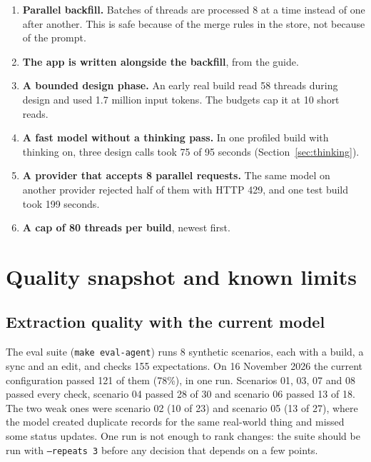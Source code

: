 \documentclass[10pt,a4paper]{article}
\newcommand{\code}[1]{\texttt{\small #1}}
\begin{document}
\begin{enumerate}
\item \textbf{Parallel backfill.} Batches of threads are processed 8 at a time instead of one after another. This is safe because of the merge rules in the store, not because of the prompt.
\item \textbf{The app is written alongside the backfill}, from the guide.
\item \textbf{A bounded design phase.} An early real build read 58 threads during design and used 1.7 million input tokens. The budgets cap it at 10 short reads.
\item \textbf{A fast model without a thinking pass.} In one profiled build with thinking on, three design calls took 75 of 95 seconds (Section~\ref{sec:thinking}).
\item \textbf{A provider that accepts 8 parallel requests.} The same model on another provider rejected half of them with HTTP 429, and one test build took 199 seconds.
\item \textbf{A cap of 80 threads per build}, newest first.
\end{enumerate}



\section{Quality snapshot and known limits}
\label{sec:limits}

\subsection{Extraction quality with the current model}

The eval suite (\code{make eval-agent}) runs 8 synthetic scenarios, each with a build, a sync
and an edit, and checks 155 expectations. On 16 November 2026 the current configuration passed
121 of them (78\%), in one run. Scenarios 01, 03, 07 and 08 passed every check, scenario 04
passed 28 of 30 and scenario 06 passed 13 of 18. The two weak ones were scenario 02 (10 of 23)
and scenario 05 (13 of 27), where the model created duplicate records for the same real-world
thing and missed some status updates. One run
is not enough to rank changes: the suite should be run with \code{--repeats 3} before any
decision that depends on a few points.
\end{document}
